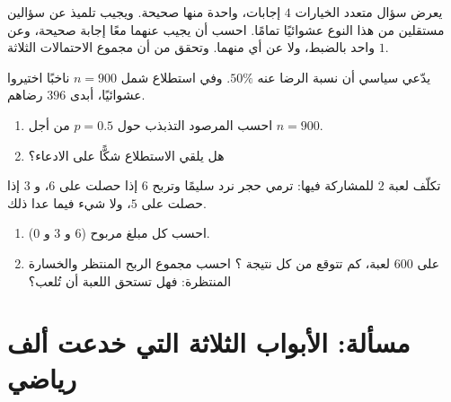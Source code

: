 \begin{exercise}[$\star\star$]\label{exo:g10:proba:7}
يعرض سؤال متعدد الخيارات $4$ إجابات، واحدة منها صحيحة. ويجيب تلميذ
عن سؤالين مستقلين من هذا النوع عشوائيًا تمامًا. احسب
 أن يجيب عنهما معًا إجابة صحيحة، وعن واحد بالضبط، ولا عن أي
منهما. وتحقق من أن مجموع الاحتمالات الثلاثة $1$.
\end{exercise}

\begin{exercise}[$\star\star$]\label{exo:g10:proba:8}
يدّعي سياسي أن نسبة الرضا عنه $50\%$. وفي استطلاع شمل $n = 900$ ناخبًا
اختيروا عشوائيًا، أبدى $396$ رضاهم.
\begin{enumerate}
  \item احسب  المرصود  التذبذب
        حول $p = 0.5$ من أجل $n = 900$.
  \item هل يلقي الاستطلاع شكًّا على الادعاء؟
\end{enumerate}
\end{exercise}

\begin{exercise}[$\star\star\star$]\label{exo:g10:proba:9}
تكلّف لعبة $2$ للمشاركة فيها: ترمي حجر نرد سليمًا وتربح $6$ إذا حصلت على
$6$، و $3$ إذا حصلت على $5$، ولا شيء فيما عدا ذلك.
\begin{enumerate}
  \item احسب  كل مبلغ مربوح ($6$ و $3$ و $0$).
  \item على  $600$ لعبة، كم تتوقع من كل نتيجة ؟
        احسب مجموع الربح المنتظر والخسارة المنتظرة: فهل تستحق اللعبة
        أن تُلعب؟
\end{enumerate}
\end{exercise}

\section{مسألة: الأبواب الثلاثة التي خدعت ألف
رياضي}


